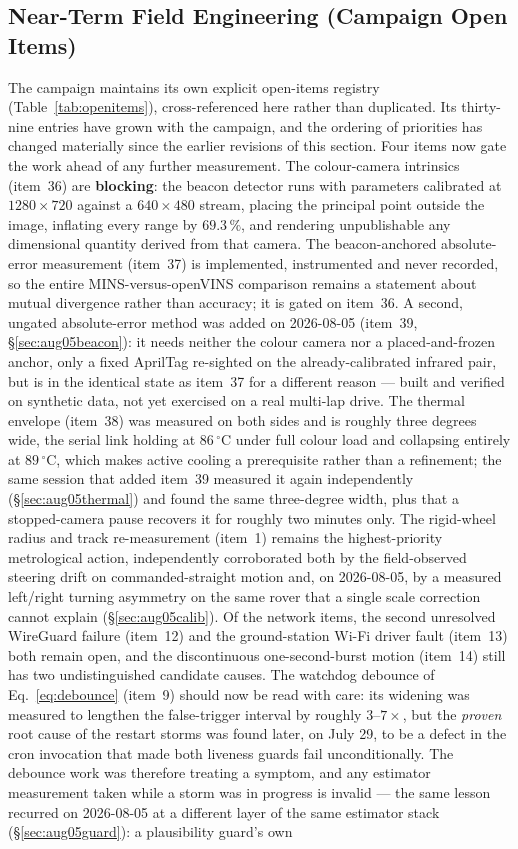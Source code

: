 \subsection{Near-Term Field Engineering (Campaign Open Items)}

The campaign maintains its own explicit open-items registry (Table~\ref{tab:openitems}), cross-referenced here rather than duplicated. Its thirty-nine entries have grown with the campaign, and the ordering of priorities has changed materially since the earlier revisions of this section. Four items now gate the work ahead of any further measurement. The colour-camera intrinsics (item~36) are \textbf{blocking}: the beacon detector runs with parameters calibrated at $1280\times720$ against a $640\times480$ stream, placing the principal point outside the image, inflating every range by $69.3\,\%$, and rendering unpublishable any dimensional quantity derived from that camera. The beacon-anchored absolute-error measurement (item~37) is implemented, instrumented and never recorded, so the entire MINS-versus-openVINS comparison remains a statement about mutual divergence rather than accuracy; it is gated on item~36. A second, ungated absolute-error method was added on 2026-08-05 (item~39, \S\ref{sec:aug05beacon}): it needs neither the colour camera nor a placed-and-frozen anchor, only a fixed AprilTag re-sighted on the already-calibrated infrared pair, but is in the identical state as item~37 for a different reason --- built and verified on synthetic data, not yet exercised on a real multi-lap drive. The thermal envelope (item~38) was measured on both sides and is roughly three degrees wide, the serial link holding at $86\,^\circ$C under full colour load and collapsing entirely at $89\,^\circ$C, which makes active cooling a prerequisite rather than a refinement; the same session that added item~39 measured it again independently (\S\ref{sec:aug05thermal}) and found the same three-degree width, plus that a stopped-camera pause recovers it for roughly two minutes only. The rigid-wheel radius and track re-measurement (item~1) remains the highest-priority metrological action, independently corroborated both by the field-observed steering drift on commanded-straight motion and, on 2026-08-05, by a measured left/right turning asymmetry on the same rover that a single scale correction cannot explain (\S\ref{sec:aug05calib}). Of the network items, the second unresolved WireGuard failure (item~12) and the ground-station Wi-Fi driver fault (item~13) both remain open, and the discontinuous one-second-burst motion (item~14) still has two undistinguished candidate causes. The watchdog debounce of Eq.~\eqref{eq:debounce} (item~9) should now be read with care: its widening was measured to lengthen the false-trigger interval by roughly $3$--$7\times$, but the \emph{proven} root cause of the restart storms was found later, on July 29, to be a  defect in the cron invocation that made both liveness guards fail unconditionally. The debounce work was therefore treating a symptom, and any estimator measurement taken while a storm was in progress is invalid --- the same lesson recurred on 2026-08-05 at a different layer of the same estimator stack (\S\ref{sec:aug05guard}): a plausibility guard's own 